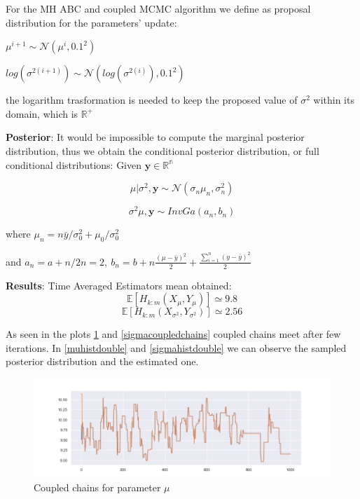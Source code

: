 \documentclass {article}
\begin{document}
For the MH ABC and coupled MCMC algorithm we define as proposal distribution for the parameters' update:
\begin{center}
	$ \mu^{i+1} \sim	\mathcal{N}( \mu^{i}, 0.1^2) $
	
	$ log(\sigma^{2(i+1)}) \sim \mathcal{N}( log(\sigma^{2(i)}), 0.1^2) $
\end{center}
the logarithm trasformation is needed to keep the proposed value of $ \sigma^2$ within its domain, 
which is $\mathbb{R^{+}}$


	
\textbf{Posterior}:
It would be impossible to compute the marginal posterior distribution, thus we obtain the conditional posterior distribution, or full conditional distributions:
Given $\mathbf{y} \in \mathbb{R^{n}} $

	
	$$ \mu| \sigma^2,\mathbf{y} \sim	\mathcal{N}( \sigma_n\mu_n, \sigma_n^2) $$
	
	$$ \sigma^{2} \mu,\mathbf{y} \sim InvGa( a_n,b_n)$$
	
	where $ \mu_n= n\bar y/\sigma_0^2 + \mu_0/\sigma_0^2$
		
and $a_n= a + n/2n=2, \  b_n=b + n\frac{(\mu-\bar y)^2}{2} +	\frac{\sum_{i=1}^n (y-\bar y)^2}2{} $


\textbf{Results}:
Time Averaged Estimators mean obtained:
$$ \mathbb{E}[H_{k:m}(X_{\mu}, Y_{\mu})] \simeq 9.8   %
$$
$$ \mathbb{E}[H_{k:m}(X_{\sigma^2}, Y_{\sigma^2})] \simeq 2.56   %
$$


As seen in the plots \ref{mucoupledchains} and \ref{sigmacoupledchains} coupled chains meet after few iterations.
In \ref{muhistdouble} and \ref{sigmahistdouble} we can observe the sampled posterior distribution and the estimated one.


\begin{figure}[h!]
	\centering
	\includegraphics[width=\textwidth]{doublecoupling_pack/doublecoupling_mu_chain_meeting}
	\caption{Coupled chains for parameter $\mu$ }   %
	\label{mucoupledchains}
\end{figure}
\end{document}
